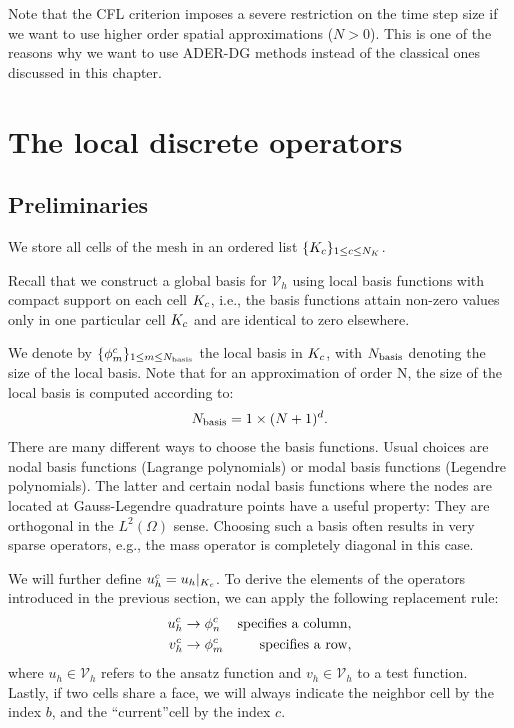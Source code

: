 \documentclass{scrreprt}
\begin{document}
\begin{remark}
{\rm
Note that the CFL criterion imposes a severe restriction on the
time step size if we want to use higher order spatial approximations
($N>0$). This is one of the reasons why we want to use ADER-DG methods 
instead of the classical ones discussed in this chapter.} 
\end{remark}
\section{The local discrete operators}
\subsection{Preliminaries}
We store all cells of the mesh in an ordered list $\{
K_c \}_{1 \leq c \leq {N_{K}}}$.

Recall that we construct a global basis
for $\mathcal{V}_h$ using local basis
functions with compact support on each cell $K_c$, i.e., the basis functions
attain non-zero values only in one particular cell $K_c$ and are identical
to zero elsewhere.

We denote by $\{ \phi^{c}_{m} \}_{1 \leq m \leq
N_\textup{basis}}$ the local basis in $K_c$,
with $N_\textup{basis}$ denoting the size of the local basis. 
Note that for an approximation of order N, the size of the local basis is 
computed according to:
\begin{align}
N_\textup{basis} = 1\times(N+1)^d.
\end{align}
There are many different ways to choose the basis functions.
Usual choices are nodal basis functions (Lagrange polynomials) or
modal basis functions (Legendre polynomials).
The latter and certain nodal basis functions where the nodes are located at
Gauss-Legendre quadrature points have a useful property:
They are orthogonal in the $L^2(\Omega)$ sense.
Choosing such a basis often results in very sparse operators, e.g.,
the mass operator is completely diagonal in this case.

We will further define $u_h^c=u_h|_{K_c}$. 
To derive the elements of the operators introduced
in the previous section, we can apply the following replacement rule:
\begin{align}
u_h^{c} &\rightarrow \phi^{c}_{n} & \textup{specifies a column}, \\
v_h^{c} &\rightarrow \phi^{c}_{m} & \textup{specifies a row},
\end{align}
where $u_h\in\mathcal{V}_h$ refers to the ansatz function and  
$v_h\in\mathcal{V}_h$ to a test function.
Lastly, if two cells share a face, we will always indicate the 
neighbor cell by the index $b$, and the ``current''cell
by the index $c$.
\end{document}
